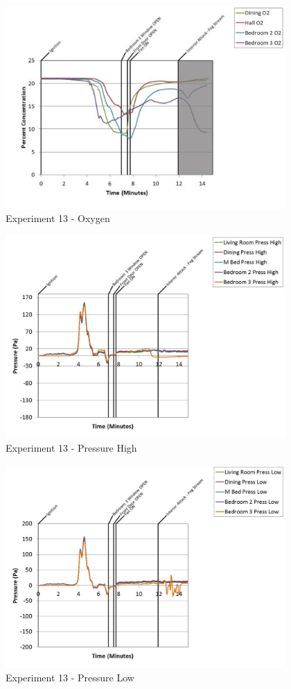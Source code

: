 \documentclass{article}
\begin{document}
\begin{appendices}
	\begin{figure}[h!]
		\centering
		\includegraphics[height=3.05in]{0_Images/Results_Charts/Exp_13_Charts/Oxygen.pdf}
		\caption{Experiment 13 - Oxygen}
	\end{figure}
 
	\clearpage

	\begin{figure}[h!]
		\centering
		\includegraphics[height=3.05in]{0_Images/Results_Charts/Exp_13_Charts/PressureHigh.pdf}
		\caption{Experiment 13 - Pressure High}
	\end{figure}
 

	\begin{figure}[h!]
		\centering
		\includegraphics[height=3.05in]{0_Images/Results_Charts/Exp_13_Charts/PressureLow.pdf}
		\caption{Experiment 13 - Pressure Low}
	\end{figure}
 

\end{appendices}
\end{document}
